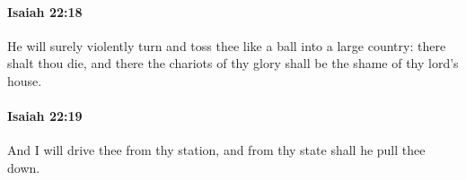 		\paragraph{Isaiah 22:18} %
			\label{ISAIAH-22-18}

			He will surely violently turn and toss thee like a ball into a large country: there shalt thou die, and there the chariots of thy glory shall be the shame of thy lord's house.


		\paragraph{Isaiah 22:19} %
			\label{ISAIAH-22-19}

			And I will drive thee from thy station, and from thy state shall he pull thee down.


